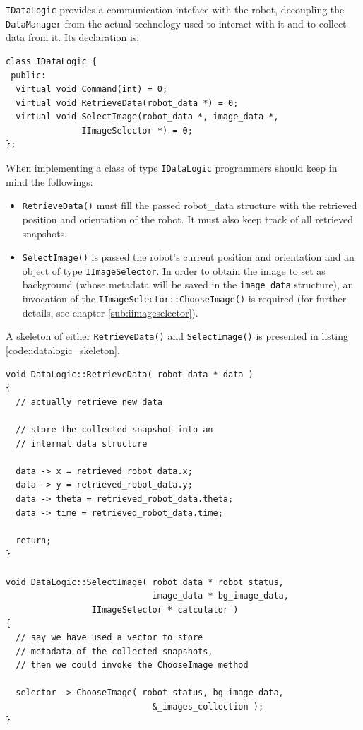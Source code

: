 \texttt{IDataLogic} provides a communication inteface 
with the robot, decoupling the \texttt{DataManager} 
from the actual technology used to interact with it 
and to collect data from it. Its declaration is: 
\begin{lstlisting}[caption={\texttt{IDataLogic} declaration}, label={code:idatalogic}, frame=trBL]
class IDataLogic {
 public:
  virtual void Command(int) = 0;
  virtual void RetrieveData(robot_data *) = 0;
  virtual void SelectImage(robot_data *, image_data *,
			   IImageSelector *) = 0;
};
\end{lstlisting}
%
When implementing a class of type \texttt{IDataLogic}
programmers should keep in mind the followings:
\begin{itemize}
  \item \texttt{RetrieveData()} must fill the passed 
    robot\_data structure with the retrieved position and
    orientation of the robot. It must also keep track of 
    all retrieved snapshots.
  \item \texttt{SelectImage()} is passed the robot's current 
    position and orientation and an object of type 
    \texttt{IImageSelector}. In order to obtain the image 
    to set as background (whose metadata will be saved 
    in the \texttt{image\_data} structure), an 
    invocation of the \texttt{IImageSelector::ChooseImage()}
    is required (for further details, see chapter
    \ref{sub:iimageselector}).
\end{itemize}
%
A skeleton of either \texttt{RetrieveData()} and 
\texttt{SelectImage()} is presented in listing 
\ref{code:idatalogic_skeleton}.
%
\begin{lstlisting}[caption={\texttt{IDataLogic} methods skeleton}, label={code:idatalogic_skeleton}, frame=trBL]
void DataLogic::RetrieveData( robot_data * data )
{
  // actually retrieve new data

  // store the collected snapshot into an
  // internal data structure
  
  data -> x = retrieved_robot_data.x;
  data -> y = retrieved_robot_data.y;
  data -> theta = retrieved_robot_data.theta; 
  data -> time = retrieved_robot_data.time;

  return;
}

void DataLogic::SelectImage( robot_data * robot_status, 
                             image_data * bg_image_data,
			     IImageSelector * calculator )
{
  // say we have used a vector to store 
  // metadata of the collected snapshots, 
  // then we could invoke the ChooseImage method

  selector -> ChooseImage( robot_status, bg_image_data, 
                             &_images_collection );
}
\end{lstlisting}
%

